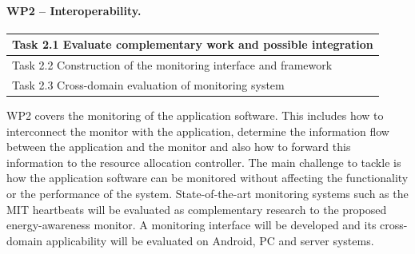 \documentclass{article}
\begin{document}
\paragraph{WP2 -- Interoperability.}
\begin{table}
\vspace{-0.5cm}
\small
\begin{tabular}{ | l |}
\hline
Task 2.1 Evaluate complementary work and possible integration  \\ \hline
Task 2.2 Construction of the monitoring interface and framework   \\ \hline
Task 2.3 Cross-domain evaluation of monitoring system	\\ \hline
\end{tabular}
\vspace{-0.3cm}
\end{table}
WP2 covers the monitoring of the application software.
This includes how to interconnect the monitor with the application, determine the information flow between the application and the monitor and also how to forward this information to the resource allocation controller.
The main challenge to tackle is how the application software can be monitored without affecting the functionality or the performance of the system.
State-of-the-art monitoring systems such as the MIT heartbeats \cite{Hoffmann:10} will be evaluated as complementary research to the proposed energy-awareness monitor.
A monitoring interface will be developed and its cross-domain applicability will be evaluated on Android, PC and server systems.
\end{document}
